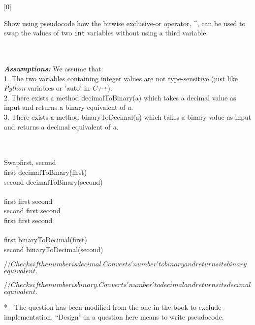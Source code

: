 \documentclass[addpoints]{exam}
\begin{document}
\begin{questions}
	
	Show using pseudocode how the bitwise exclusive-or operator, \^{}, can be used to swap the values of two {\tt int} variables without using a third variable.
	\begin{solution}\\ \\
		\textbf{\textit{Assumptions:}} We assume that:\\1. The two variables containing integer values are not type-sensitive (just like \textit{Python} variables or 'auto' in \textit{C++}). \\2. There exists a method decimalToBinary(a) which takes a decimal value as input and returns a binary equivalent of \textit{a}. \\3. There exists a method binaryToDecimal(a) which takes a binary value as input and returns a decimal equivalent of \textit{a}.\\ \\ \\
		\begin{pseudocode}{Swap}{first, second}
			\label{Swap}
			\\
				first \GETS decimalToBinary(first)\\
				second \GETS decimalToBinary(second)\\ \\
				first \GETS first \oplus second\\
				second \GETS first \oplus second\\
				first \GETS first \oplus second\\ \\
				first \GETS binaryToDecimal(first)\\
				second \GETS binaryToDecimal(second)\\
			\ENDPROCEDURE
			
				$//Checks if the number is decimal. Converts 'number' to binary and returns its binary$\\$equivalent. $\\
			\ENDPROCEDURE
			
				$//Checks if the number is binary. Converts 'number' to decimal and returns its decimal$\\ $equivalent. $\\
			\ENDPROCEDURE
		\end{pseudocode}
	\end{solution}
	
	
	* - The question has been modified from the one in the book to exclude implementation. ``Design'' in a question here means to write pseudocode.
	\end{questions}
\end{document}
